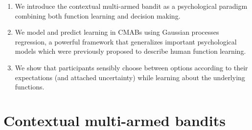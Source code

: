 \documentclass[a4paper,natbib]{apa6}
\begin{document}
\begin{enumerate}
\item We introduce the contextual multi-armed bandit as a psychological paradigm combining both function learning and decision making. 

\item We model and predict learning in CMABs using Gaussian processes regression, a powerful framework that generalizes important psychological models which were previously proposed to describe human function learning.

\item We show that participants sensibly choose between options according to their expectations (and attached uncertainty) while learning about the underlying functions.
\end{enumerate}






\section{Contextual multi-armed bandits}
\end{document}
